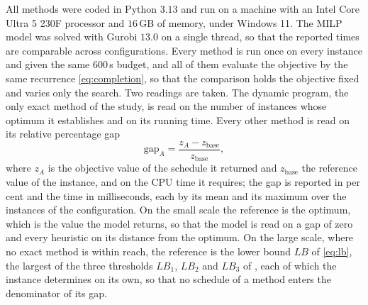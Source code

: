 \documentclass[12pt]{article}
\begin{document}
\begin{sloppypar}
        All methods were coded in Python $3.13$ and run on a machine with an Intel Core Ultra 5 230F
        processor and $16$\,GB of memory, under Windows 11. The MILP model was solved with Gurobi
        $13.0$ on a single thread, so that the reported times are comparable across configurations.
        Every method is run once on every instance and given the same $600$\,s budget, and all of them
        evaluate the objective by the same recurrence \cref{eq:completion}, so that the comparison holds
        the objective fixed and varies only the search. Two readings are taken. The dynamic program, the
        only exact method of the study, is read on the number of instances whose optimum it establishes
        and on its running time. Every other method is read on its relative percentage gap
        \begin{equation}\label{eq:gap}
            \text{gap}_A = \frac{z_A-z_{\text{base}}}{z_{\text{base}}},
        \end{equation}
        where $z_A$ is the objective value of the schedule it returned and $z_{\text{base}}$ the
        reference value of the instance, and on the CPU time it requires; the gap is reported in per
        cent and the time in milliseconds, each by its mean and its maximum over the instances of the
        configuration. On the small scale the reference is the optimum, which is the value the model
        returns, so that the model is read on a gap of zero and every heuristic on its distance from the
        optimum. On the large scale, where no exact method is within reach, the reference is the lower
        bound $LB$ of \cref{eq:lb}, the largest of the three thresholds $LB_1$, $LB_2$ and $LB_3$ of
        , each of which the instance determines on its own, so that no schedule of a
        method enters the denominator of its gap.
        

\end{sloppypar}
\end{document}
